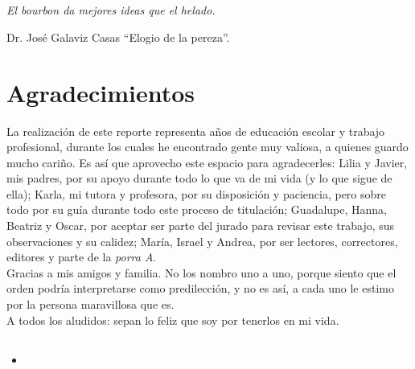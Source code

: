 \chapter*{}\label{epigrafe}
\thispagestyle{empty}
\vspace*{150px}
\begin{flushright}
	\begin{Large}
		\textit{El bourbon da mejores ideas que el helado.}\\
	\end{Large}
Dr. José Galaviz Casas ``Elogio de la pereza''.
\end{flushright}
\clearpage
\thispagestyle{empty}

\chapter*{Agradecimientos}\label{agradecimientos}
\thispagestyle{empty}
\noindent La realización de este reporte representa años de educación escolar y trabajo profesional, durante los cuales he encontrado gente muy valiosa, a quienes guardo mucho cariño. Es así que aprovecho este espacio para agradecerles: Lilia y Javier, mis padres, por su apoyo durante todo lo que va de mi vida (y lo que sigue de ella); Karla, mi tutora y profesora, por su disposición y paciencia, pero sobre todo por su guía durante todo este proceso de titulación; Guadalupe, Hanna, Beatriz y Oscar, por aceptar ser parte del jurado para revisar este trabajo, sus observaciones y su calidez; María, Israel y Andrea, por ser lectores, correctores, editores y parte de la \textit{porra A}.\\
\indent Gracias a mis amigos y familia. No los nombro uno a uno, porque siento que el orden podría interpretarse como predilección, y no es así, a cada uno le estimo por la persona maravillosa que es.\\
\indent A todos los aludidos: sepan lo feliz que soy por tenerlos en mi vida.
\pagebreak
\section*{}
\begin{itemize}
	\item[]	
\end{itemize}
\thispagestyle{empty}
